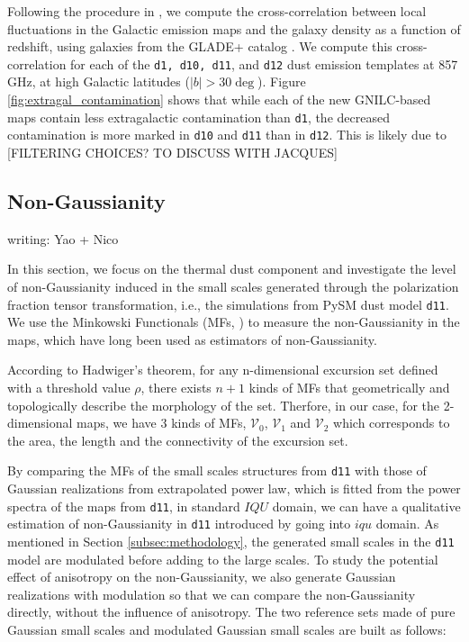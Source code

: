 \documentclass[twocolumn]{aastex631}
\newcommand{\deleven}{{\tt d11}}
\begin{document}
Following the procedure in \citet{Chiang:2019}, we compute the cross-correlation between local fluctuations in the Galactic emission maps and the galaxy density as a function of redshift, using galaxies from the GLADE+ catalog \citep{Dalya:2022}. We compute this cross-correlation for each of the \texttt{d1, d10, d11}, and \texttt{d12} dust emission templates at 857 GHz, at high Galactic latitudes ($\left|b\right| > 30\deg$). Figure \ref{fig:extragal_contamination} shows that while each of the new GNILC-based maps contain less extragalactic contamination than \texttt{d1}, the decreased contamination is more marked in \texttt{d10} and \texttt{d11} than in \texttt{d12}. This is likely due to [FILTERING CHOICES? TO DISCUSS WITH JACQUES]


\subsection{Non-Gaussianity} \label{sec:nongaussianity}
writing: Yao + Nico

In this section, we focus on the thermal dust component and investigate the level of non-Gaussianity induced in the small scales generated through the polarization fraction tensor transformation, i.e., the simulations from PySM dust model \deleven{}. We use the Minkowski Functionals (MFs, \cite{Minkowski1903})  to measure the non-Gaussianity in the maps, which have long been used as estimators of non-Gaussianity.

According to Hadwiger’s theorem\citep{hadwigerVorlesungenUeberInhalt1957}, for any n-dimensional excursion set defined with a threshold value $\rho$, there exists $n+1$ kinds of MFs that geometrically and topologically describe the morphology of the set. Therfore, in our case, for the 2-dimensional maps, we have 3 kinds of MFs, $\mathcal{V}_0$, $\mathcal{V}_1$ and $\mathcal{V}_2$ which corresponds to the area, the length and the connectivity of the excursion set.

By comparing the MFs of the small scales structures from \deleven{} with those of Gaussian realizations from extrapolated power law, which is fitted from the power spectra of the maps from \deleven{}, in standard $IQU$ domain, we can have a qualitative estimation of non-Gaussianity in \deleven{} introduced by going into $iqu$ domain. As mentioned in Section \ref{subsec:methodology}, the generated small scales in the \deleven{} model are modulated before adding to the large scales. To study the potential effect of anisotropy on the non-Gaussianity, we also generate Gaussian realizations with modulation so that we can compare the non-Gaussianity directly, without the influence of anisotropy. The two reference sets made of pure Gaussian small scales and modulated Gaussian small scales are built as follows:
\end{document}
